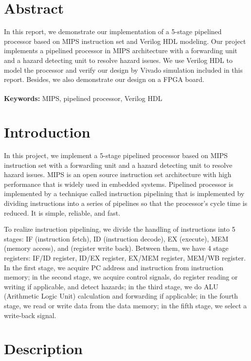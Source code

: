 \documentclass[a4paper]{article}
\begin{document}
\section{Abstract}
In this report, we demonstrate our implementation of a 5-stage pipelined processor based on MIPS instruction set and Verilog HDL modeling.
Our project implements a pipelined processor in MIPS architecture with a forwarding unit and a hazard detecting unit to resolve hazard issues.
We use Verilog HDL to model the processor and verify our design by Vivado simulation included in this report. Besides, we also demonstrate our design on a FPGA board.
\\\\
\noindent\textbf{Keywords:} MIPS, pipelined processor, Verilog HDL
\section{Introduction}
In this project, we implement a 5-stage pipelined processor based on MIPS instruction set with a forwarding unit and a hazard detecting unit to resolve hazard issues.
MIPS is an open source instruction set architecture with high performance that is widely used in embedded systems.
Pipelined processor is implemented by a technique called instruction pipelining that is implemented by dividing instructions into a series of pipelines so that the processor's cycle time is reduced.
It is simple, reliable, and fast.

To realize instruction pipelining, we divide the handling of instructions into 5 stages: IF (instruction fetch), ID (instruction decode), EX (execute), MEM (memory access), and (register write back).
Between them, we have 4 stage registers: IF/ID register, ID/EX register, EX/MEM register, MEM/WB register.
In the first stage, we acquire PC address and instruction from instruction memory;
in the second stage, we acquire control signals, do register reading or writing if applicable, and detect hazards;
in the third stage, we do ALU (Arithmetic Logic Unit) calculation and forwarding if applicable;
in the fourth stage, we read or write data from the data memory;
in the fifth stage, we select a write-back signal.
\section{Description}
\end{document}
